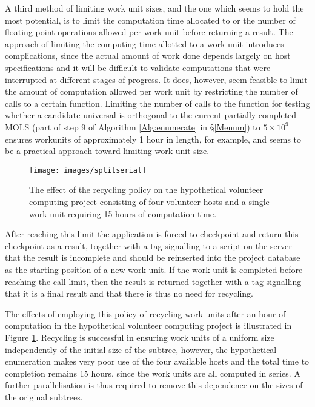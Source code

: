 A third method of limiting work unit sizes, and the one which seems to hold the most potential, is to limit the computation time allocated to or the number of floating point operations allowed per work unit before returning a result. 
The approach of limiting the computing time allotted to a work unit introduces complications, since the actual amount of work done  depends largely on host specifications and it will be difficult to validate computations that were interrupted at different stages of progress. It does, however, seem feasible to limit the amount of computation allowed per work unit by restricting the number of calls to a certain function. 
Limiting the number of calls  to the function for testing whether a candidate universal is orthogonal to the current partially completed MOLS (part of step 9 of Algorithm \ref{Alg:enumerate} in \S\ref{Menum}) to $5\times 10^9$ ensures workunits of approximately 1 hour in length, for example, and seems to be a practical approach toward limiting work unit size. \begin{figure}[t]
\centering
\texttt{[image: images/splitserial]}
\caption{The effect of the recycling policy on the hypothetical volunteer computing project consisting of four volunteer hosts and a single work unit requiring 15 hours of computation time.} \label{fig:5rec}
\end{figure}
After reaching this limit the application is forced to checkpoint and return this checkpoint as a result, together with a tag signalling to a script on the server that the result is incomplete and should be reinserted into the project database as the starting position of a new work unit. If the work unit is  completed before reaching the call limit, then the result is returned together with a tag signalling that it is a final result and that there is thus no need for recycling. 

 
The effects of employing this policy of recycling work units after an hour of computation in the hypothetical volunteer computing project is illustrated in Figure \ref{fig:5rec}. Recycling is successful in ensuring work units of a uniform size independently of the initial size of the subtree, however, the hypothetical enumeration makes very poor use of the four available hosts and the total time to completion remains 15 hours, since the work units are all computed in series. A further parallelisation is thus required to remove this dependence on the sizes of the original subtrees.



